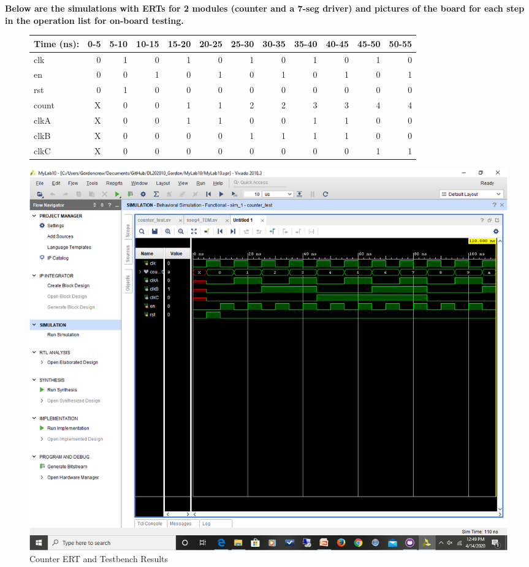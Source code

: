 \documentclass[11pt]{article}
\begin{document}
\clearpage

\textbf{Below are the simulations with ERTs for 2 modules (counter and a 7-seg driver) and pictures of the board for each step in the operation list for on-board testing.} 
\bigskip
\bigskip
\bigskip

\begin{figure}[ht]\centering
	\begin{tabular}{l|rrrrrrrrrrr}
		Time (ns): & 0-5 & 5-10 & 10-15 & 15-20 & 20-25 & 25-30 & 30-35 & 35-40 & 40-45 & 45-50 & 50-55 \\
		\midrule 
		clk & 0 & 1 & 0 & 1 & 0 & 1 & 0 & 1 & 0 & 1 & 0 \\
		en & 0 & 0 & 1 & 0 & 1 & 0 & 1 & 0 & 1 & 0 & 1 \\
		rst & 0 & 1 & 0 & 0 & 0 & 0 & 0 & 0 & 0 & 0 & 0 \\
		\midrule
		count & X & 0 & 0 & 1 & 1 & 2 & 2 & 3 & 3 & 4 & 4  \\
		clkA & X & 0 & 0 & 1 & 1 & 0 & 0 & 1 & 1 & 0 & 0  \\
		clkB & X & 0 & 0 & 0 & 0 & 1 & 1 & 1 & 1 & 0 & 0  \\
		clkC & X & 0 & 0 & 0 & 0 & 0 & 0 & 0 & 0 & 1 & 1  \\
		\bottomrule
	\end{tabular}\medskip

	\includegraphics[width=1.15\textwidth, trim=7.5cm 14cm 0cm 4cm,clip]{counter.png}
	\caption{Counter ERT and Testbench Results}
	\label{fig:sim_with_table}
\end{figure}
\end{document}

